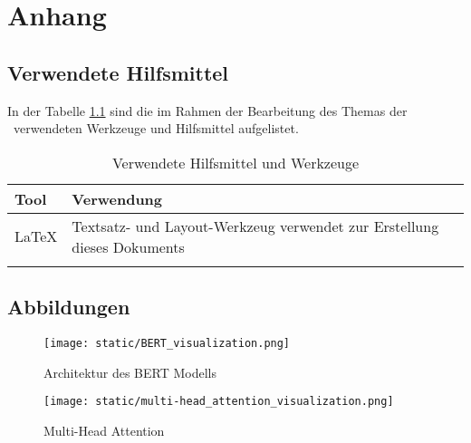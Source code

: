 \chapter{Anhang}

\section{Verwendete Hilfsmittel}
In der Tabelle \ref{tab:tooling} sind die im Rahmen der Bearbeitung des Themas der \IthesisKindDE~verwendeten Werkzeuge und Hilfsmittel aufgelistet.

\begin{table}[h!]
\caption{Verwendete Hilfsmittel und Werkzeuge}
\begin{tabular}{|l|l|}
\hline 
\rowcolor{lightgray} Tool & Verwendung \\
\hline
\LaTeX & Textsatz- und Layout-Werkzeug verwendet zur Erstellung dieses Dokuments \\
\hline
 & \\
\hline
\end{tabular}
\label{tab:tooling}
\end{table}

\section{Abbildungen}

\begin{figure}[htbp]
    \begin{center}
        \texttt{[image: static/BERT\_visualization.png]}
        \caption{\label{fig:BERT_visualization} Architektur des BERT Modells \cite{peltarion2020bert}}
    \end{center}
\end{figure}

\begin{figure}[htbp]
    \begin{center}
        \texttt{[image: static/multi-head\_attention\_visualization.png]}
        \caption{\label{fig:multi_head_attention_visualization} Multi-Head Attention \cite{peltarion2020bert}}
    \end{center}
\end{figure}

